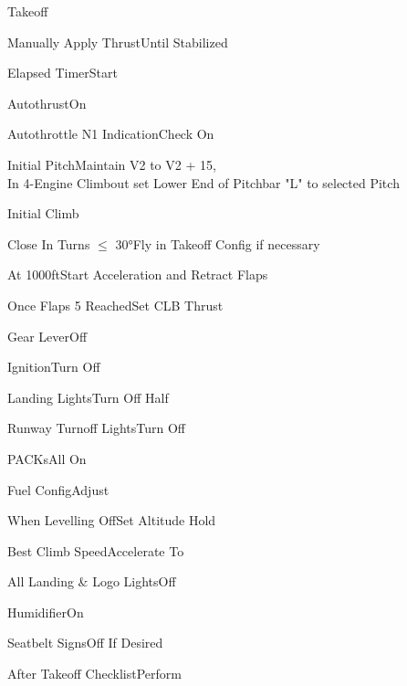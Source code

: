 \documentclass[sim-use, blue_items]{checklist}
\begin{document}
\begin{checklist}{Takeoff}
	\item{Manually Apply Thrust}{Until Stabilized}
	\item{Elapsed Timer}{Start}
	\item{Autothrust}{On}
	\item{Autothrottle N1 Indication}{Check On}
	\item{Initial Pitch}{Maintain V2 to V2 + 15,\\In 4-Engine Climbout set Lower End of Pitchbar "L" to selected Pitch}
\end{checklist}

\begin{checklist}{Initial Climb}
	\item{Close In Turns $\leq$ 30°}{Fly in Takeoff Config if necessary}
	\item{At 1000ft}{Start Acceleration and Retract Flaps}
	\item{Once Flaps 5 Reached}{Set CLB Thrust}
	 {
		\item{Gear Lever}{Off}
		\item{Ignition}{Turn Off}
		\item{Landing Lights}{Turn Off Half}
		\item{Runway Turnoff Lights}{Turn Off}
		\item{PACKs}{All On}
		\item{Fuel Config}{Adjust}
	}
	\item{When Levelling Off}{Set Altitude Hold}
	 {
		\item{Best Climb Speed}{Accelerate To}
		\item{All Landing \& Logo Lights}{Off}
		\item{Humidifier}{On}
		\item{Seatbelt Signs}{Off If Desired}
		\item{After Takeoff Checklist}{Perform}
	}
\end{checklist}
\end{document}
